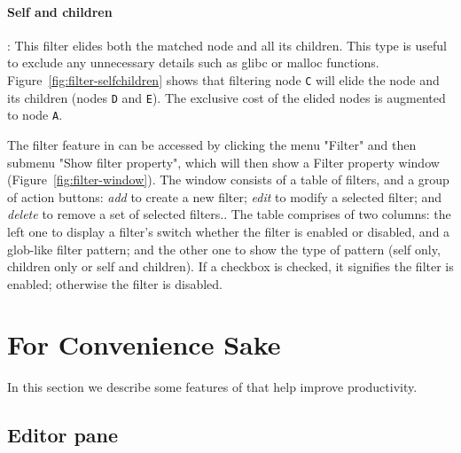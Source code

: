 \paragraph{Self and children}: This filter elides both the matched node and all its children. 
This type is useful to exclude any unnecessary details such as glibc or malloc functions.
Figure~\ref{fig:filter-selfchildren} shows that filtering node \texttt{C} will elide the node and its children (nodes \texttt{D} and \texttt{E}). 
The exclusive cost of the elided nodes is augmented to node \texttt{A}.

The filter feature in \hpcviewer{} can be accessed by clicking the menu "Filter" and then submenu "Show filter property", which will then show a  Filter property window (Figure~\ref{fig:filter-window}).
The window consists of a table of filters, and a group of action buttons: \emph{add} to create a new filter; \emph{edit} to modify a selected filter; and \emph{delete} to remove a set of selected filters..
The table comprises of two columns: the left one to display a filter's switch whether the filter is enabled or disabled, and a glob-like filter pattern; and the other one to show the type of pattern (self only, children only or self and children).
If a checkbox is checked, it signifies the filter is enabled; otherwise the filter is disabled.



\section{For Convenience Sake}

In this section we describe some features of \hpcviewer{} that help improve productivity.


\subsection{Editor pane}

